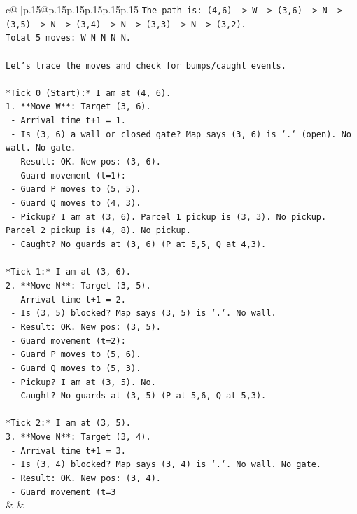 \documentclass{article}
\begin{document}
{\begin{supertabular}{c@{$\;$}|p{.15\linewidth}@{}p{.15\linewidth}p{.15\linewidth}p{.15\linewidth}p{.15\linewidth}p{.15\linewidth}}
{{{\texttt{The path is: (4,6) {-}> W {-}> (3,6) {-}> N {-}> (3,5) {-}> N {-}> (3,4) {-}> N {-}> (3,3) {-}> N {-}> (3,2).} \\
\texttt{Total 5 moves: W N N N N.} \\
\\ 
\texttt{Let's trace the moves and check for bumps/caught events.} \\
\\ 
\texttt{*Tick 0 (Start):* I am at (4, 6).} \\
\texttt{1. **Move W**: Target (3, 6).} \\
\texttt{   {-} Arrival time t+1 = 1.} \\
\texttt{   {-} Is (3, 6) a wall or closed gate? Map says (3, 6) is `.` (open). No wall. No gate.} \\
\texttt{   {-} Result: OK. New pos: (3, 6).} \\
\texttt{   {-} Guard movement (t=1):} \\
\texttt{     {-} Guard P moves to (5, 5).} \\
\texttt{     {-} Guard Q moves to (4, 3).} \\
\texttt{   {-} Pickup? I am at (3, 6). Parcel 1 pickup is (3, 3). No pickup. Parcel 2 pickup is (4, 8). No pickup.} \\
\texttt{   {-} Caught? No guards at (3, 6) (P at 5,5, Q at 4,3).} \\
\\ 
\texttt{*Tick 1:* I am at (3, 6).} \\
\texttt{2. **Move N**: Target (3, 5).} \\
\texttt{   {-} Arrival time t+1 = 2.} \\
\texttt{   {-} Is (3, 5) blocked? Map says (3, 5) is `.`. No wall.} \\
\texttt{   {-} Result: OK. New pos: (3, 5).} \\
\texttt{   {-} Guard movement (t=2):} \\
\texttt{     {-} Guard P moves to (5, 6).} \\
\texttt{     {-} Guard Q moves to (5, 3).} \\
\texttt{   {-} Pickup? I am at (3, 5). No.} \\
\texttt{   {-} Caught? No guards at (3, 5) (P at 5,6, Q at 5,3).} \\
\\ 
\texttt{*Tick 2:* I am at (3, 5).} \\
\texttt{3. **Move N**: Target (3, 4).} \\
\texttt{   {-} Arrival time t+1 = 3.} \\
\texttt{   {-} Is (3, 4) blocked? Map says (3, 4) is `.`. No wall. No gate.} \\
\texttt{   {-} Result: OK. New pos: (3, 4).} \\
\texttt{   {-} Guard movement (t=3} \\
            }
        }
    }
    & & \\ \\


\end{supertabular}}
\end{document}
